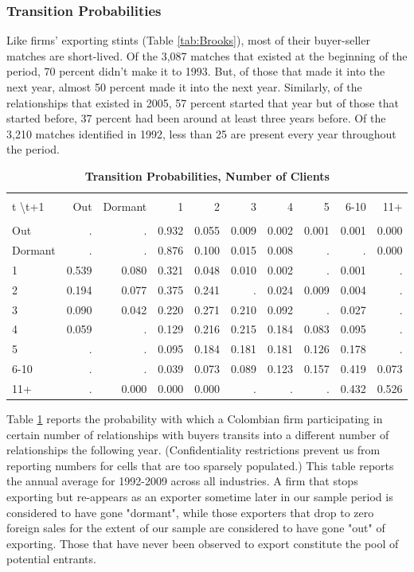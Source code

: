 \documentclass[12pt]{article}
\begin{document}
\subsubsection{Transition Probabilities}

Like firms' exporting stints (Table \ref{tab:Brooks}), most of their
buyer-seller matches are short-lived. Of the 3,087 matches that existed at
the beginning of the period, 70 percent didn't make it to 1993. But, of
those that made it into the next year, almost 50 percent made it into the
next year. Similarly, of the relationships that existed in 2005, 57 percent
started that year but of those that started before, 37 percent had been
around at least three years before. Of the 3,210 matches identified in 1992,
less than 25 are present every year throughout the period.

\begin{table}[bph]
\caption{\textbf{Transition Probabilities, Number of Clients}}
\label{tab:trans_probs}\centering
\begin{tabular}{l|rrrrrrrrr}
\hline\hline
&  &  &  &  &  &  &  &  &  \\[1px] 
t \textbackslash t+1 & Out & Dormant & 1 & 2 & 3 & 4 & 5 & 6-10 & 11+ \\ 
\hline
&  &  &  &  &  &  &  &  &  \\[1px] 
Out & . & . & 0.932 & 0.055 & 0.009 & 0.002 & 0.001 & 0.001 & 0.000 \\ 
Dormant & . & . & 0.876 & 0.100 & 0.015 & 0.008 & . & . & 0.000 \\ 
1 & 0.539 & 0.080 & 0.321 & 0.048 & 0.010 & 0.002 & . & 0.001 & . \\ 
2 & 0.194 & 0.077 & 0.375 & 0.241 & . & 0.024 & 0.009 & 0.004 & . \\ 
3 & 0.090 & 0.042 & 0.220 & 0.271 & 0.210 & 0.092 & . & 0.027 & . \\ 
4 & 0.059 & . & 0.129 & 0.216 & 0.215 & 0.184 & 0.083 & 0.095 & . \\ 
5 & . & . & 0.095 & 0.184 & 0.181 & 0.181 & 0.126 & 0.178 & . \\ 
6-10 & . & . & 0.039 & 0.073 & 0.089 & 0.123 & 0.157 & 0.419 & 0.073 \\ 
11+ & . & 0.000 & 0.000 & 0.000 & . & . & . & 0.432 & 0.526 \\ \hline
\end{tabular}
\centering
\end{table}

Table \ref{tab:trans_probs} reports the probability with which a Colombian
firm participating in certain number of relationships with buyers transits
into a different number of relationships the following year.
(Confidentiality restrictions prevent us from reporting numbers for cells
that are too sparsely populated.) This table reports the annual average for
1992-2009 across all industries. A firm that stops exporting but re-appears
as an exporter sometime later in our sample period is considered to have
gone "dormant", while those exporters that drop to zero foreign sales for
the extent of our sample are considered to have gone "out" of exporting.
Those that have never been observed to export constitute the pool of
potential entrants.
\end{document}
